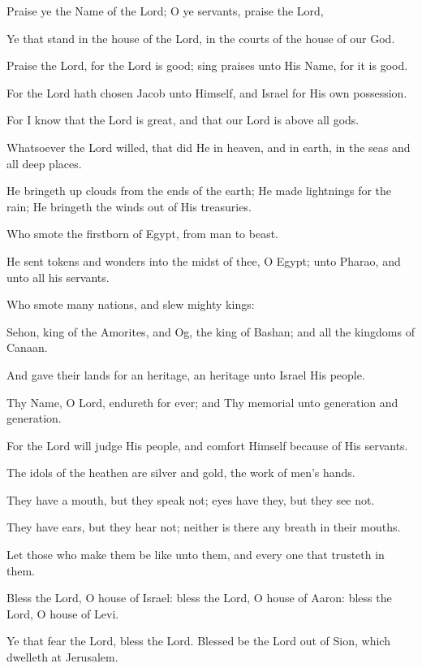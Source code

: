Praise ye the Name of the Lord; O ye servants, praise the Lord,

Ye that stand in the house of the Lord, in the courts of the house of our God.

Praise the Lord, for the Lord is good; sing praises unto His Name, for it is good.

For the Lord hath chosen Jacob unto Himself, and Israel for His own possession.

For I know that the Lord is great, and that our Lord is above all gods.

Whatsoever the Lord willed, that did He in heaven, and in earth, in the seas and all deep places.

He bringeth up clouds from the ends of the earth; He made lightnings for the rain; He bringeth the winds out of His treasuries.

Who smote the firstborn of Egypt, from man to beast.

He sent tokens and wonders into the midst of thee, O Egypt; unto Pharao, and unto all his servants.

Who smote many nations, and slew mighty kings:

Sehon, king of the Amorites, and Og, the king of Bashan; and all the kingdoms of Canaan.

And gave their lands for an heritage, an heritage unto Israel His people.

Thy Name, O Lord, endureth for ever; and Thy memorial unto generation and generation.

For the Lord will judge His people, and comfort Himself because of His servants.

The idols of the heathen are silver and gold, the work of men's hands.

They have a mouth, but they speak not; eyes have they, but they see not.

They have ears, but they hear not; neither is there any breath in their mouths.

Let those who make them be like unto them, and every one that trusteth in them.

Bless the Lord, O house of Israel: bless the Lord, O house of Aaron: bless the Lord, O house of Levi.

Ye that fear the Lord, bless the Lord. Blessed be the Lord out of Sion, which dwelleth at Jerusalem.

